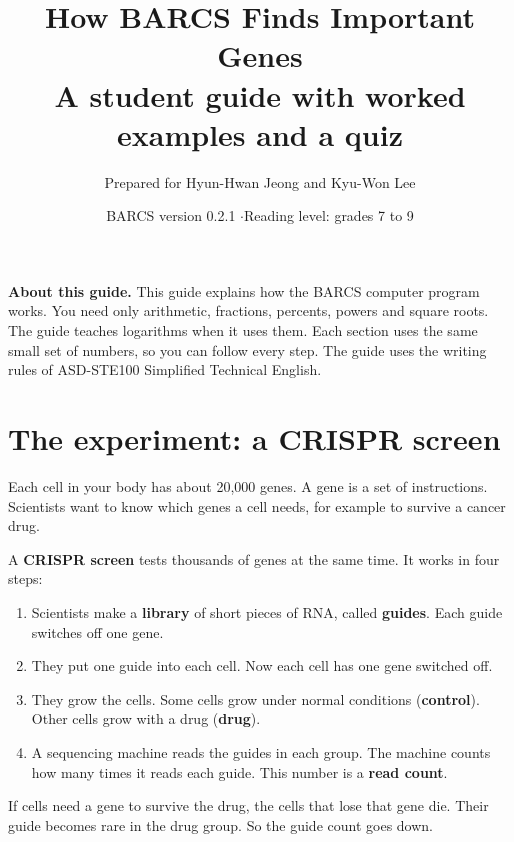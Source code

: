 \documentclass[12pt]{article}
\title{\textbf{How BARCS Finds Important Genes}\\[6pt]
\large A student guide with worked examples and a quiz}
\author{Prepared for Hyun-Hwan Jeong and Kyu-Won Lee}
\date{BARCS version 0.2.1 \quad$\cdot$\quad Reading level: grades 7 to 9}
\begin{document}
\maketitle

\begin{center}
\begin{minipage}{0.85\textwidth}
\small
\textbf{About this guide.} This guide explains how the BARCS computer
program works. You need only arithmetic, fractions, percents, powers and
square roots. The guide teaches logarithms when it uses them. Each section
uses the same small set of numbers, so you can follow every step. The guide
uses the writing rules of ASD-STE100 Simplified Technical English.
\end{minipage}
\end{center}

\tableofcontents
\newpage

\section{The experiment: a CRISPR screen}

Each cell in your body has about 20{,}000 genes. A gene is a set of
instructions. Scientists want to know which genes a cell needs, for example
to survive a cancer drug.

A \textbf{CRISPR screen} tests thousands of genes at the same time. It works
in four steps:

\begin{enumerate}
\item Scientists make a \textbf{library} of short pieces of RNA, called
  \textbf{guides}. Each guide switches off one gene.
\item They put one guide into each cell. Now each cell has one gene switched
  off.
\item They grow the cells. Some cells grow under normal conditions
  (\textbf{control}). Other cells grow with a drug (\textbf{drug}).
\item A sequencing machine reads the guides in each group. The machine
  counts how many times it reads each guide. This number is a
  \textbf{read count}.
\end{enumerate}

If cells need a gene to survive the drug, the cells that lose that gene die.
Their guide becomes rare in the drug group. So the guide count goes down.
\end{document}
